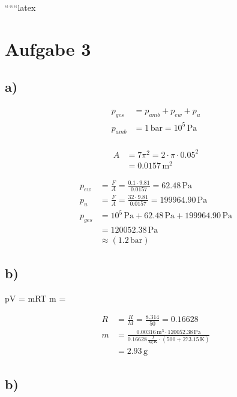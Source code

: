 
``````latex


\section*{Aufgabe 3}

\subsection*{a)}

\begin{align*}
p_{ges} &= p_{amb} + p_{ew} + p_{u} \\
p_{amb} &= 1 \, \text{bar} = 10^5 \, \text{Pa} \\
\end{align*}

\begin{align*}
A &= 7 \pi^2 = 2 \cdot \pi \cdot 0.05^2 \\
  &= 0.0157 \, \text{m}^2
\end{align*}

\begin{align*}
p_{ew} &= \frac{F}{A} = \frac{0.1 \cdot 9.81}{0.0157} = 62.48 \, \text{Pa} \\
p_{u} &= \frac{F}{A} = \frac{32 \cdot 9.81}{0.0157} = 199964.90 \, \text{Pa} \\
p_{ges} &= 10^5 \, \text{Pa} + 62.48 \, \text{Pa} + 199964.90 \, \text{Pa} \\
        &= 120052.38 \, \text{Pa} \\
        &\approx (1.2 \, \text{bar})
\end{align*}

\subsection*{b)}

 \quad pV = mRT \quad \Rightarrow \quad m = 

\begin{align*}
R &= \frac{R}{M} = \frac{8.314}{50} = 0.16628 \\
m &= \frac{0.00316 \, \text{m}^3 \cdot 120052.38 \, \text{Pa}}{0.16628 \, \frac{\text{J}}{\text{kg} \cdot \text{K}} \cdot (500 + 273.15 \, \text{K})} \\
  &= 2.93 \, \text{g}
\end{align*}

\subsection*{b)}

